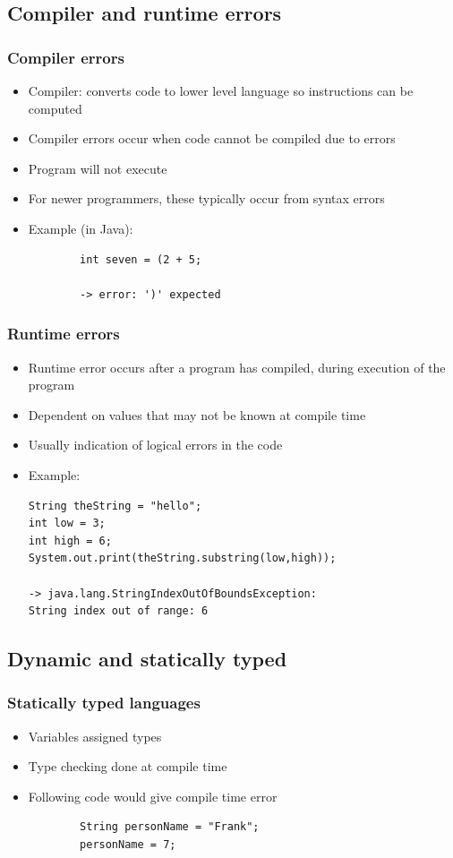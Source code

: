 \documentclass{beamer}
\begin{document}
\subsection{Compiler and runtime errors}

\begin{frame}[fragile]
	\frametitle{Compiler errors}
		\begin{itemize}
			\item Compiler: converts code to lower level language so instructions can be computed
			\item Compiler errors occur when code cannot be compiled due to errors
			\item Program will not execute
			\item For newer programmers, these typically occur from syntax errors
			\item Example (in Java):
			\begin{verbatim}
		int seven = (2 + 5;
		
		-> error: ')' expected
			\end{verbatim}
		\end{itemize}
\end{frame}

\begin{frame}[fragile]
	\frametitle{Runtime errors}
		\begin{itemize}
			\item Runtime error occurs after a program has compiled, during execution of the program
			\item Dependent on values that may not be known at compile time
			\item Usually indication of logical errors in the code
			\item Example:
			\begin{verbatim}
String theString = "hello";
int low = 3;
int high = 6;
System.out.print(theString.substring(low,high));

-> java.lang.StringIndexOutOfBoundsException:
String index out of range: 6
			\end{verbatim}
		\end{itemize}
\end{frame}

\subsection{Dynamic and statically typed}

\begin{frame}[fragile]
  \frametitle{Statically typed languages}
	\begin{itemize}
		\item Variables assigned types
		\item Type checking done at compile time
		\item Following code would give compile time error
		\begin{verbatim}
		String personName = "Frank";
		personName = 7;
		\end{verbatim}
	\end{itemize}
\end{frame}
\end{document}
